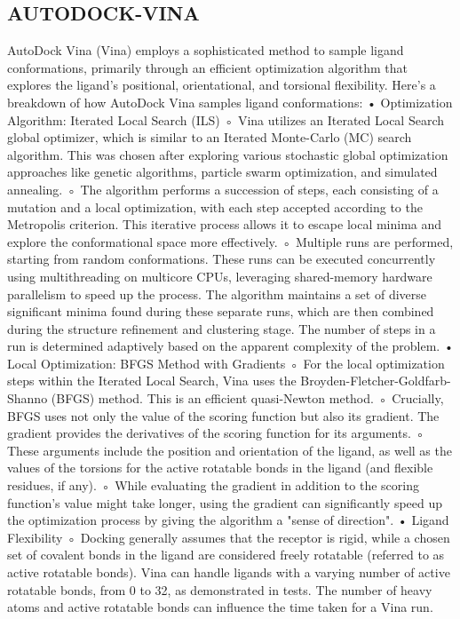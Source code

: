 \documentclass[11pt]{article}
\begin{document}
\subsection*{AUTODOCK-VINA}
AutoDock Vina (Vina) employs a sophisticated method to sample ligand conformations, primarily through an efficient optimization algorithm that explores the ligand's positional, orientational, and torsional flexibility.
Here's a breakdown of how AutoDock Vina samples ligand conformations:
• Optimization Algorithm: Iterated Local Search (ILS)
    ◦ Vina utilizes an Iterated Local Search global optimizer, which is similar to an Iterated Monte-Carlo (MC) search algorithm. This was chosen after exploring various stochastic global optimization approaches like genetic algorithms, particle swarm optimization, and simulated annealing.
    ◦ The algorithm performs a succession of steps, each consisting of a mutation and a local optimization, with each step accepted according to the Metropolis criterion. This iterative process allows it to escape local minima and explore the conformational space more effectively.
    ◦ Multiple runs are performed, starting from random conformations. These runs can be executed concurrently using multithreading on multicore CPUs, leveraging shared-memory hardware parallelism to speed up the process. The algorithm maintains a set of diverse significant minima found during these separate runs, which are then combined during the structure refinement and clustering stage. The number of steps in a run is determined adaptively based on the apparent complexity of the problem.
• Local Optimization: BFGS Method with Gradients
    ◦ For the local optimization steps within the Iterated Local Search, Vina uses the Broyden-Fletcher-Goldfarb-Shanno (BFGS) method. This is an efficient quasi-Newton method.
    ◦ Crucially, BFGS uses not only the value of the scoring function but also its gradient. The gradient provides the derivatives of the scoring function for its arguments.
    ◦ These arguments include the position and orientation of the ligand, as well as the values of the torsions for the active rotatable bonds in the ligand (and flexible residues, if any).
    ◦ While evaluating the gradient in addition to the scoring function's value might take longer, using the gradient can significantly speed up the optimization process by giving the algorithm a "sense of direction".
• Ligand Flexibility
    ◦ Docking generally assumes that the receptor is rigid, while a chosen set of covalent bonds in the ligand are considered freely rotatable (referred to as active rotatable bonds). Vina can handle ligands with a varying number of active rotatable bonds, from 0 to 32, as demonstrated in tests. The number of heavy atoms and active rotatable bonds can influence the time taken for a Vina run.
\end{document}
